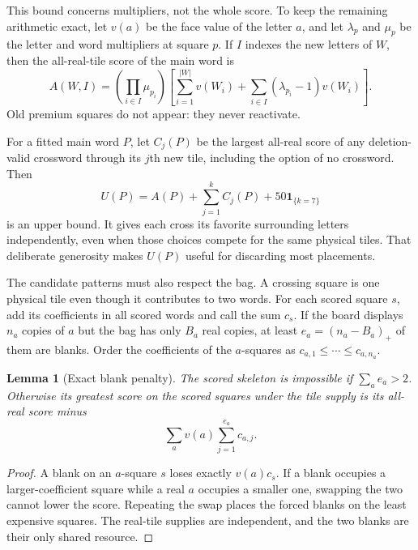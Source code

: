 \documentclass{article}
\theoremstyle{plain}
\newtheorem{lemma}[theorem]{Lemma}
\begin{document}
This bound concerns multipliers, not the whole score. To keep the remaining
arithmetic exact, let $v(a)$ be the face value of the letter $a$, and let
$\lambda_p$ and $\mu_p$ be the letter and word multipliers at square $p$. If
$I$ indexes the new letters of $W$, then the all-real-tile score of the main
word is
\begin{equation}\label{eq:main}
 A(W,I)=\left(\prod_{i\in I}\mu_{p_i}\right)
 \left[\sum_{i=1}^{|W|}v(W_i)+
       \sum_{i\in I}(\lambda_{p_i}-1)v(W_i)\right].
\end{equation}
Old premium squares do not appear: they never reactivate.

For a fitted main word $P$, let $C_j(P)$ be the largest all-real score of any
deletion-valid crossword through its $j$th new tile, including the option of no
crossword. Then
\begin{equation}\label{eq:independent}
 U(P)=A(P)+\sum_{j=1}^k C_j(P)+50\mathbf1_{\{k=7\}}
\end{equation}
is an upper bound. It gives each cross its favorite surrounding letters
independently, even when those choices compete for the same physical tiles.
That deliberate generosity makes $U(P)$ useful for discarding most placements.

The candidate patterns must also respect the bag. A crossing square is one physical tile even
though it contributes to two words. For each scored square $s$, add its
coefficients in all scored words and call the sum $c_s$. If the board displays
$n_a$ copies of $a$ but the bag has only $B_a$ real copies, at least
$e_a=(n_a-B_a)_+$ of them are blanks. Order the coefficients of the $a$-squares
as $c_{a,1}\le\cdots\le c_{a,n_a}$.

\begin{lemma}[Exact blank penalty]\label{lem:blank}
The scored skeleton is impossible if $\sum_a e_a>2$. Otherwise its greatest
score on the scored squares under the tile supply is its all-real score minus
\begin{equation}\label{eq:blank}
 \sum_a v(a)\sum_{j=1}^{e_a}c_{a,j}.
\end{equation}
\end{lemma}
\begin{proof}
A blank on an $a$-square $s$ loses exactly $v(a)c_s$. If a blank occupies a
larger-coefficient square while a real $a$ occupies a smaller one, swapping the
two cannot lower the score. Repeating the swap places the forced blanks on the
least expensive squares. The real-tile supplies are independent, and the two
blanks are their only shared resource.
\end{proof}
\end{document}
